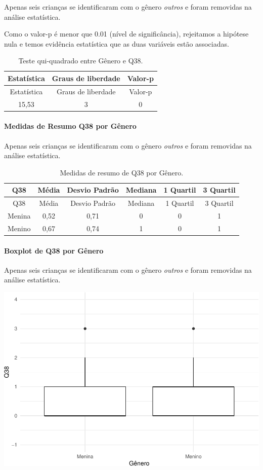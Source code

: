 \documentclass[]{article}
\let\oldparagraph\paragraph
\renewcommand{\paragraph}[1]{\oldparagraph{#1}\mbox{}}
\begin{document}
Apenas seis crianças se identificaram com o gênero \emph{outros} e foram removidas na análise estatística.

Como o valor-p é menor que 0.01 (nível de significância), rejeitamos a hipótese nula e temos evidência estatística que as duas variáveis estão associadas.

\begin{longtable}[]{@{}ccc@{}}
\caption{\label{tab:unnamed-chunk-1441}Teste qui-quadrado entre Gênero e Q38.}\tabularnewline
\toprule
Estatística & Graus de liberdade & Valor-p\tabularnewline
\midrule
\endfirsthead
\toprule
Estatística & Graus de liberdade & Valor-p\tabularnewline
\midrule
\endhead
15,53 & 3 & 0\tabularnewline
\bottomrule
\end{longtable}

\cleardoublepage

\hypertarget{medidas-de-resumo-q38-por-guxeanero}{%
\paragraph{Medidas de Resumo Q38 por Gênero}\label{medidas-de-resumo-q38-por-guxeanero}}

Apenas seis crianças se identificaram com o gênero \emph{outros} e foram removidas na análise estatística.

\begin{longtable}[]{@{}cccccc@{}}
\caption{\label{tab:unnamed-chunk-1442}Medidas de resumo de Q38 por Gênero.}\tabularnewline
\toprule
Q38 & Média & Desvio Padrão & Mediana & 1 Quartil & 3 Quartil\tabularnewline
\midrule
\endfirsthead
\toprule
Q38 & Média & Desvio Padrão & Mediana & 1 Quartil & 3 Quartil\tabularnewline
\midrule
\endhead
Menina & 0,52 & 0,71 & 0 & 0 & 1\tabularnewline
Menino & 0,67 & 0,74 & 1 & 0 & 1\tabularnewline
\bottomrule
\end{longtable}

\hypertarget{boxplot-de-q38-por-guxeanero}{%
\paragraph{Boxplot de Q38 por Gênero}\label{boxplot-de-q38-por-guxeanero}}

Apenas seis crianças se identificaram com o gênero \emph{outros} e foram removidas na análise estatística.

\begin{center}\includegraphics[width=0.75\linewidth]{relatorio_covid19_files/figure-latex/unnamed-chunk-1443-1} \end{center}
\end{document}
